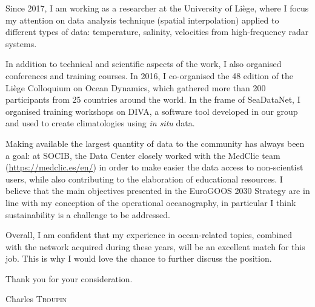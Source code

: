 \documentclass[svgnames]{article}
\begin{document}
Since 2017, I am working as a researcher at the University of Liège, where I focus my attention on data analysis technique (spatial interpolation) applied to different types of data: temperature, salinity, velocities from high-frequency radar systems.

In addition to technical and scientific aspects of the work, I also organised conferences and training courses. In 2016, I co-organised the 48 edition of the Liège Colloquium on Ocean Dynamics, which gathered more than 200 participants from 25 countries around the world. In the frame of SeaDataNet, I organised training workshops on DIVA, a software tool developed in our group and used to create climatologies using \textit{in situ} data. 

Making available the largest quantity of data to the community has always been a goal: at SOCIB, the Data Center closely worked with the MedClic team (\url{https://medclic.es/en/}) in order to make easier the data access to non-scientist users, while also contributing to the elaboration of educational resources. I believe that the main objectives presented in the EuroGOOS 2030 Strategy are in line with my conception of the operational oceanography, in particular I think sustainability is a challenge to be addressed. 

Overall, I am confident that my experience in ocean-related topics, combined with the network acquired during these years, will be an excellent match for this job. This is why I would love the chance to further discuss the position.

\vspace{.5cm}
Thank you for your consideration.

\vspace{1.cm}
\hfill Charles \textsc{Troupin}

%
%
%
%
%
\end{document}
